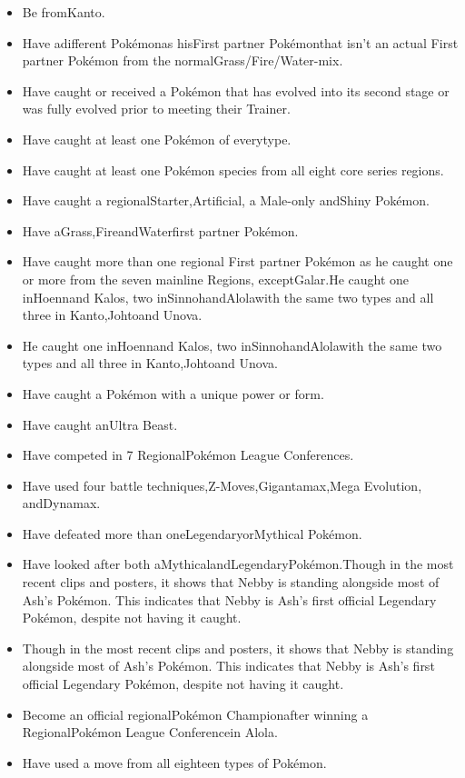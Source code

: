 \documentclass[a4paper,12pt]{article}
\begin{document}
\begin{itemize}
\item Be fromKanto.
\item Have adifferent Pokémonas hisFirst partner Pokémonthat isn't an actual First partner Pokémon from the normalGrass/Fire/Water-mix.
\item Have caught or received a Pokémon that has evolved into its second stage or was fully evolved prior to meeting their Trainer.
\item Have caught at least one Pokémon of everytype.
\item Have caught at least one Pokémon species from all eight core series regions.
\item Have caught a regionalStarter,Artificial, a Male-only andShiny Pokémon.
\item Have aGrass,FireandWaterfirst partner Pokémon.
\item Have caught more than one regional First partner Pokémon as he caught one or more from the seven mainline Regions, exceptGalar.He caught one inHoennand Kalos, two inSinnohandAlolawith the same two types and all three in Kanto,Johtoand Unova.
\item He caught one inHoennand Kalos, two inSinnohandAlolawith the same two types and all three in Kanto,Johtoand Unova.
\item Have caught a Pokémon with a unique power or form.
\item Have caught anUltra Beast.
\item Have competed in 7 RegionalPokémon League Conferences.
\item Have used four battle techniques,Z-Moves,Gigantamax,Mega Evolution, andDynamax.
\item Have defeated more than oneLegendaryorMythical Pokémon.
\item Have looked after both aMythicalandLegendaryPokémon.Though in the most recent clips and posters, it shows that Nebby is standing alongside most of Ash's Pokémon. This indicates that Nebby is Ash's first official Legendary Pokémon, despite not having it caught.
\item Though in the most recent clips and posters, it shows that Nebby is standing alongside most of Ash's Pokémon. This indicates that Nebby is Ash's first official Legendary Pokémon, despite not having it caught.
\item Become an official regionalPokémon Championafter winning a RegionalPokémon League Conferencein Alola.
\item Have used a move from all eighteen types of Pokémon.
\end{itemize}\\ \par \vspace{0.5cm}
\end{document}

